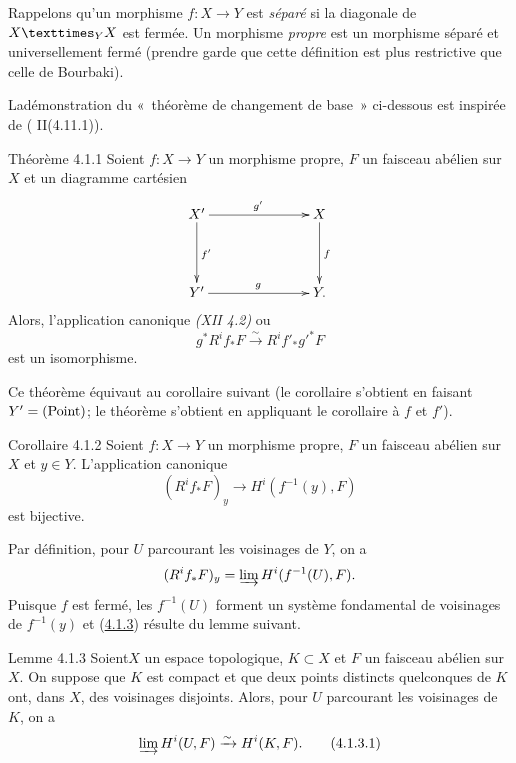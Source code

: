 \documentclass[10pt]{../fichiers-configuration-latex/smfart}
\begin{document}
Rappelons qu'un morphisme $f : X \to Y$ est \emph{séparé} si la
diagonale de $\fprod{X}{X}{Y}$ est fermée. Un morphisme \emph{propre}
est un morphisme séparé et universellement fermé (prendre garde que
cette définition est plus restrictive que celle de Bourbaki).

La\pageoriginale démonstration du « théorème de changement de base »
ci-dessous
est inspirée de (\cite{SGA4-05bis:5} II(4.11.1)).

\begin{enonce*}{Théorème 4.1.1}
Soient $f : X \to Y$ un morphisme propre, $F$ un faisceau abélien sur
$X$ et un diagramme cartésien
\[
\xymatrix@C=2.5cm@R=1.5cm{
X' \ar[r]^{g'} \ar[d]^{f'}& X\ar[d]^{f}\\
Y' \ar[r]^{g}& Y.
}
\]
Alors, l'application canonique \emph{(XII 4.2)} ou \emph{}
$$
g^{\ast} R^i f_{\ast} F \xrightarrow{\sim} R^i f'_{\ast} {g'}^{\ast}F
$$
est un isomorphisme.
\end{enonce*}

Ce théorème équivaut au corollaire suivant (le corollaire s'obtient en
faisant $Y'= (\operatorname{Point})$; le théorème s'obtient en appliquant le
corollaire à $f$ et $f'$).

\begin{enonce*}{Corollaire 4.1.2}
Soient $f : X \to Y$ un morphisme propre, $F$ un faisceau abélien sur
$X$ et $y \in Y$. L'application canonique
$$
(R^i f_{\ast} F)_y \longrightarrow H^i(f^{-1} (y), F)
$$
est bijective.
\end{enonce*}

Par définition, pour $U$ parcourant les voisinages de $Y$, on a
$$
(R^if_{\ast} F)_y = \varinjlim H^i(f^{-1} (U), F){}.
$$
Puisque $f$ est fermé, les $f^{-1}(U)$ forment un système fondamental
de voisinages de $f^{-1}(y)$ et (\hyperref[Vbis.lem4.1.3]{4.1.3}) résulte du lemme suivant.

\begin{enonce*}{Lemme 4.1.3}
Soient\pageoriginale $X$ un espace topologique, $K \subset X$ et $F$
un faisceau
abélien sur $X$. On suppose que $K$ est compact et que deux points
distincts quelconques de $K$ ont, dans $X$, des voisinages
disjoints. Alors, pour $U$ parcourant les voisinages de $K$, on a
\begin{equation*}
\varinjlim H^i(U, F) \xrightarrow{\sim} H^i(K, F){}.\tag{4.1.3.1}
\end{equation*}
\end{enonce*}
\end{document}

